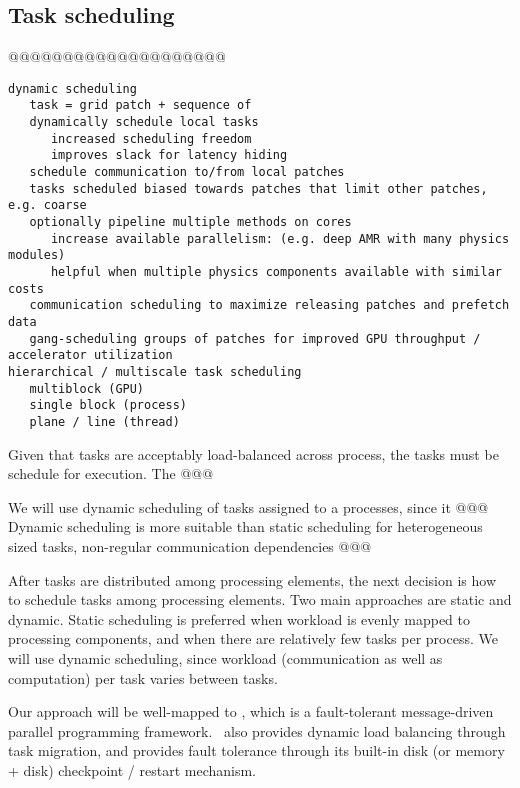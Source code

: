 \documentclass{article}
\begin{document}
\subsection{Task scheduling} \label{ss:design-scheduling}

@@@@@@@@@@@@@@@@@@@@

\begin{verbatim}
dynamic scheduling
   task = grid patch + sequence of 
   dynamically schedule local tasks
      increased scheduling freedom
      improves slack for latency hiding
   schedule communication to/from local patches
   tasks scheduled biased towards patches that limit other patches, e.g. coarse
   optionally pipeline multiple methods on cores
      increase available parallelism: (e.g. deep AMR with many physics modules)
      helpful when multiple physics components available with similar costs
   communication scheduling to maximize releasing patches and prefetch data
   gang-scheduling groups of patches for improved GPU throughput / accelerator utilization
hierarchical / multiscale task scheduling
   multiblock (GPU)
   single block (process)
   plane / line (thread)
\end{verbatim}

Given that tasks are acceptably load-balanced across process, the
tasks must be schedule for execution.  The @@@


We will use dynamic scheduling of tasks assigned to a processes, since
it @@@  Dynamic scheduling is more suitable than static scheduling for
heterogeneous sized tasks, non-regular communication dependencies @@@


After tasks are distributed among processing elements, the next
decision is how to schedule tasks among processing elements.  Two main
approaches are static and dynamic.  Static scheduling is preferred
when workload is evenly mapped to processing components, and when
there are relatively few tasks per process.  We will use dynamic
scheduling, since workload (communication as well as computation) per
task varies between tasks.

 Our approach will be well-mapped to \charm,
which is a fault-tolerant message-driven parallel programming
framework.  \charm\ also provides dynamic load balancing through task
migration, and provides fault tolerance through its built-in disk (or
memory + disk) checkpoint / restart mechanism.
\end{document}
